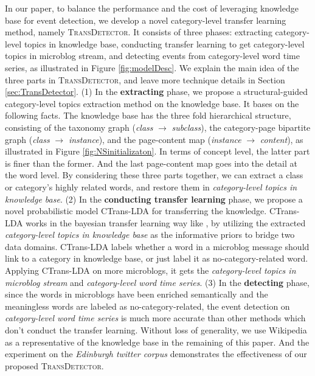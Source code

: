 \documentclass[runningheads,a4paper]{llncs}
\theoremstyle{exampstyle}
\begin{document}
In our paper, to balance the performance and the cost of leveraging knowledge base for event detection, we develop a novel category-level transfer learning method, namely \textsc{TransDetector}.
It consists of three phases: extracting category-level topics in knowledge base, conducting transfer learning to get category-level topics in microblog stream, and detecting events from category-level word time series, as illustrated in Figure \ref{fig:modelDesc}.
We explain the main idea of the three parts in \textsc{TransDetector}, and leave more technique details in Section \ref{sec:TransDetector}.
(1) In the \textbf{extracting} phase, we propose a structural-guided category-level topics extraction method on the knowledge base. 
It bases on the following facts. 
The knowledge base has the three fold hierarchical structure, consisting of the taxonomy graph (\textit{class} \(\rightarrow\) \textit{subclass}), the category-page bipartite graph (\textit{class} \(\rightarrow\) \textit{instance}), and the page-content map (\textit{instance} \(\rightarrow\) \textit{content}), as illustrated in Figure \ref{fig:NSinitializaton}.
In terms of concept level, the latter part is finer than the former. 
And the last page-content map goes into the detail at the word level. 
By considering these three parts together, we can extract a class or category's highly related words, and restore them in \textit{category-level topics in knowledge base}.
(2) In the \textbf{conducting transfer learning} phase, we propose a novel probabilistic model CTrans-LDA for transferring the knowledge.
CTrans-LDA works in the bayesian transfer learning way like \cite{dai2007transferring}, by utilizing the extracted \textit{category-level topics in knowledge base} as the informative priors to bridge two data domains. 
CTrans-LDA labels whether a word in a microblog message should link to a category in knowledge base, or just label it as no-category-related word.
Applying CTrans-LDA on more microblogs, it gets the \textit{category-level topics in microblog stream} and \textit{category-level word time series}.
(3) In the \textbf{detecting} phase, since the words in microblogs have been enriched semantically and the meaningless words are labeled as no-category-related, the event detection on \textit{category-level word time series} is much more accurate than other methods which don't conduct the transfer learning.
Without loss of generality, we use Wikipedia as a representative of the knowledge base in the remaining of this paper.
And the experiment on the \textit{Edinburgh twitter corpus} demonstrates the effectiveness of our proposed \textsc{TransDetector}.
\end{document}
